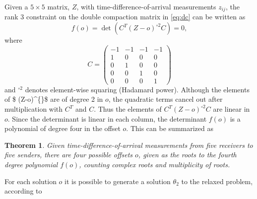 \documentclass[
]{book}
\newtheorem{theorem}{\noindent \textbf{Theorem}}
\begin{document}
Given a \(5 \times 5\) matrix, \(Z\), with time-difference-of-arrival measurements \(z_{ij}\), the rank \(3\) constraint on the double compaction matrix in \eqref{eq:dc}
can be written as
\begin{equation}
f(o) = \det ( C^T (Z-o)^{\circ 2} C )  = 0, 
\end{equation}
where
\begin{equation}
C = \begin{pmatrix}
-1 & -1 & -1 & -1\\
1 & 0 & 0 & 0\\
0  & 1 & 0 & 0\\
0 & 0 & 1 & 0 \\
0 & 0 & 0 & 1 
\end{pmatrix} 
\end{equation}
and \(^{\circ 2}\) denotes element-wise squaring (Hadamard power).
Although the elements of \$ (Z-o)\^{}\{\}\$ are of degree 2 in \(o\), the quadratic terms cancel out after multiplication with \(C^T\) and \(C\). Thus the elements of \(C^T (Z-o)^{\circ 2} C\) are linear in \(o\).
Since the determinant is linear in each column, the determinant \(f(o)\) is a polynomial of degree four in the offset \(o\). This can be summarized as

\begin{theorem}
Given time-difference-of-arrival measurements from five receivers to five senders, there are four possible offsets $o$, given as the roots to the fourth degree polynomial $f(o)$, counting complex roots and multiplicity of roots. 
\end{theorem}

For each solution \(o\) it is possible to generate a solution \(\theta_2\) to the relaxed problem,
according to
\end{document}
